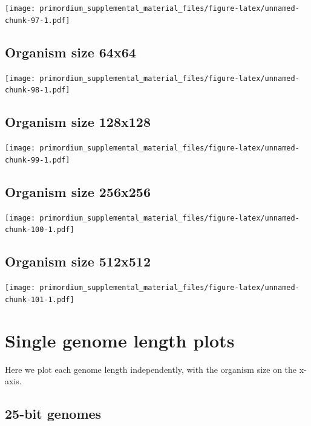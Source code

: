 \documentclass[]{book}
\begin{document}
\texttt{[image: primordium\_supplemental\_material\_files/figure-latex/unnamed-chunk-97-1.pdf]}

\hypertarget{organism-size-64x64-3}{%
\subsection{Organism size 64x64}\label{organism-size-64x64-3}}

\texttt{[image: primordium\_supplemental\_material\_files/figure-latex/unnamed-chunk-98-1.pdf]}

\hypertarget{organism-size-128x128-3}{%
\subsection{Organism size 128x128}\label{organism-size-128x128-3}}

\texttt{[image: primordium\_supplemental\_material\_files/figure-latex/unnamed-chunk-99-1.pdf]}

\hypertarget{organism-size-256x256-3}{%
\subsection{Organism size 256x256}\label{organism-size-256x256-3}}

\texttt{[image: primordium\_supplemental\_material\_files/figure-latex/unnamed-chunk-100-1.pdf]}

\hypertarget{organism-size-512x512-3}{%
\subsection{Organism size 512x512}\label{organism-size-512x512-3}}

\texttt{[image: primordium\_supplemental\_material\_files/figure-latex/unnamed-chunk-101-1.pdf]}

\hypertarget{single-genome-length-plots-1}{%
\section{Single genome length plots}\label{single-genome-length-plots-1}}

Here we plot each genome length independently, with the organism size on the x-axis.

\hypertarget{bit-genomes-5}{%
\subsection{25-bit genomes}\label{bit-genomes-5}}
\end{document}
